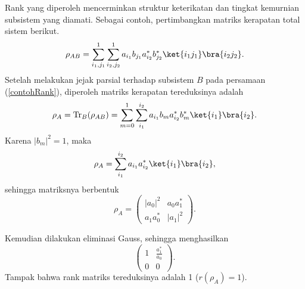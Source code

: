 Rank yang diperoleh mencerminkan struktur keterikatan dan tingkat kemurnian subsistem yang diamati. Sebagai contoh, pertimbangkan matriks kerapatan total sistem berikut.
\begin{equation}\label{contohRank}
\rho_{AB}=\sum_{i_1,j_1}^{1}\sum_{i_2,j_2}^{1}a_{i_1}b_{j_1}a^{*}_{i_2}b^{*}_{j_2}\ket{i_1j_1}\bra{i_2j_2}.
\end{equation}
Setelah melakukan jejak parsial terhadap subsistem $B$ pada persamaan (\ref{contohRank}), diperoleh matriks kerapatan tereduksinya adalah
\begin{equation}
	\rho_A=\mathrm{Tr}_B(\rho_{AB})=\sum_{m=0}^{1}\sum_{i_1}^{i_2}a_{i_1}b_{m}a^{*}_{i_2}b^{*}_{m}\ket{i_1}\bra{i_2}.
\end{equation}
Karena $|b_m|^2=1$, maka
\begin{equation}
	\rho_A=\sum_{i_1}^{i_2}a_{i_1}a^{*}_{i_2}\ket{i_1}\bra{i_2},
\end{equation}
sehingga matriksnya berbentuk
\begin{equation}
\rho_A =
\begin{pmatrix}
|a_0|^2 & a_0a^{*}_1 \\
a_1a^{*}_0 & |a_1|^2
\end{pmatrix}.
\end{equation}

Kemudian dilakukan eliminasi Gauss, sehingga menghasilkan
\begin{equation}
	\begin{pmatrix}
		1 & \frac{a^{*}_1}{a_0} \\
		0 & 0
	\end{pmatrix}.
\end{equation}
Tampak bahwa rank matriks tereduksinya adalah 1 ($r(\rho_A)=1$).

